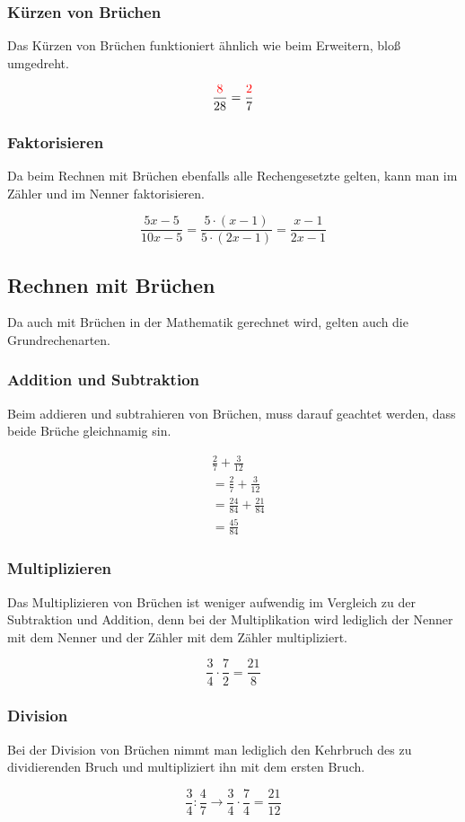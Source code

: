 \subsubsection{Kürzen von Brüchen}
Das Kürzen von Brüchen funktioniert ähnlich wie beim Erweitern, bloß umgedreht.

\begin{beispiel}
	\[\frac{\color{red}8}{28}=\frac{\color{red}2}{7}\]
\end{beispiel}

\subsubsection{Faktorisieren} Da beim Rechnen mit Brüchen ebenfalls alle Rechengesetzte gelten, kann man im Zähler und im Nenner faktorisieren.
\begin{beispiel}
	\[\frac{5x-5}{10x-5}=\frac{5\cdot(x-1)}{5\cdot(2x-1)}=\frac{x-1}{2x-1}\]
\end{beispiel}
\subsection{Rechnen mit Brüchen}\label{sec:Brueche/Rechen mit Bruechen}
Da auch mit Brüchen in der Mathematik gerechnet wird, gelten auch die Grundrechenarten.
\subsubsection{Addition und Subtraktion} Beim addieren und subtrahieren von Brüchen, muss darauf geachtet werden, dass beide Brüche gleichnamig sin. 

\begin{beispiel}
	\begin{align*}
		&\frac{2}{7}+\frac{3}{12}\\
		&=\frac{2}{7}+\frac{3}{12}\\
		&= \frac{24}{84}+\frac{21}{84}\\
		&= \frac{45}{84}
	\end{align*}	
\end{beispiel}
\subsubsection{Multiplizieren} Das Multiplizieren von Brüchen ist weniger aufwendig im Vergleich zu der Subtraktion und Addition, denn bei der Multiplikation wird lediglich der Nenner mit dem Nenner und der Zähler mit dem Zähler multipliziert.

\begin{beispiel}
	\[\frac{3}{4}\cdot\frac{7}{2}=\frac{21}{8}\]
\end{beispiel}
\subsubsection{Division} Bei der Division von Brüchen nimmt man lediglich den Kehrbruch des zu dividierenden Bruch und multipliziert ihn mit dem ersten Bruch. 

\begin{beispiel}
	\[\frac{3}{4}:\frac{4}{7} \rightarrow \frac{3}{4}\cdot \frac{7}{4}= \frac{21}{12}\]
\end{beispiel}